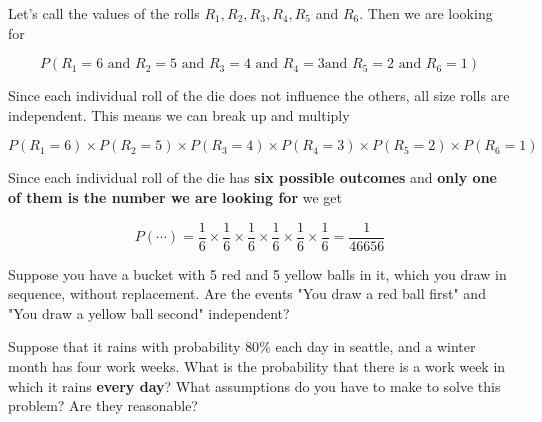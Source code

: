 %
\begin{frame}

Let's call the values of the rolls $R_1, R_2, R_3, R_4, R_5$ and $R_6$.  Then we
are looking for

$$P(R_1 = 6 \text{ and } R_2 = 5 \text{ and } R_3 = 4\text{ and } R_4 = 3 \text{
and } R_5 = 2 \text{ and } R_6 = 1)$$

Since each individual roll of the die does not influence the others, all size
rolls are independent.  This means we can break up and multiply

$$ P(R_1 = 6) \times P(R_2 = 5) \times P(R_3 = 4) \times P(R_4 = 3) \times P(R_5
= 2) \times P(R_6 = 1) $$

\end{frame}
%

%
\begin{frame}
Since each individual roll of the die has \textbf{six possible outcomes} and
\textbf{only one of them is the number we are looking for} we get

$$ P(\cdots) = \frac{1}{6} \times \frac{1}{6} \times \frac{1}{6} \times
\frac{1}{6} \times \frac{1}{6} \times \frac{1}{6} = \frac{1}{46656} $$
\end{frame}
%

%
\begin{frame}
Suppose you have a bucket with 5 red and 5 yellow balls in it, which you draw in
sequence, without replacement.  Are the events "You draw a red ball first" and 
"You draw a yellow ball second" independent?

\hfill

Suppose that it rains with probability $80 \%$ each day in seattle, and a winter
month has four work weeks.  What is the probability that there is a work week in
which it rains \textbf{every day}?  What assumptions do you have to make to
solve this problem?  Are they reasonable?
\end{frame}
